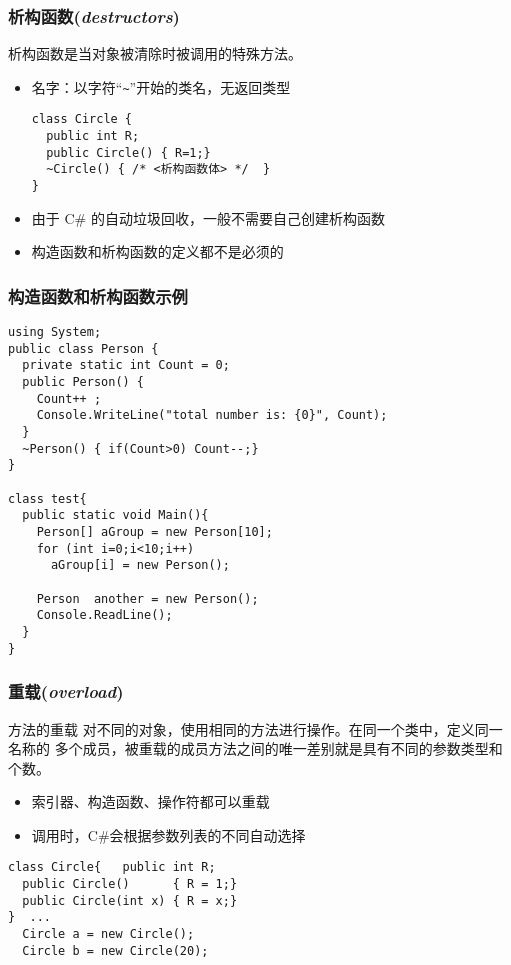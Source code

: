 \begin{frame}[fragile]
\frametitle{析构函数(\textit{destructors})}
析构函数是当对象被清除时被调用的特殊方法。
\begin{itemize}
\item 名字：以字符“\verb|~|”开始的类名，无返回类型
\begin{lstlisting}[escapeinside=<>]
class Circle {
  public int R;
  public Circle() { R=1;}
  ~Circle() { /* <析构函数体> */  }
}
\end{lstlisting}
  \pause
\item 由于 C\# 的自动垃圾回收，一般不需要自己创建析构函数
  \pause
\item 构造函数和析构函数的定义都不是必须的
\end{itemize}
\end{frame}

\begin{frame}
\frametitle{构造函数和析构函数示例}
\begin{lstlisting}
using System;
public class Person {
  private static int Count = 0;
  public Person() {
    Count++ ;
    Console.WriteLine("total number is: {0}", Count);
  }
  ~Person() { if(Count>0) Count--;}
}

class test{
  public static void Main(){
    Person[] aGroup = new Person[10];
    for (int i=0;i<10;i++)
      aGroup[i] = new Person();

    Person  another = new Person();
    Console.ReadLine();
  }
}

\end{lstlisting}
\end{frame}


\begin{frame}[fragile]
\frametitle{重载(\textit{overload})}
\begin{block}{方法的重载}
  \CJKindent 对不同的对象，使用相同的方法进行操作。在同一个类中，定义同一名称的
  多个成员，被重载的成员方法之间的唯一差别就是具有不同的参数类型和个数。
\end{block}
\pause
\begin{itemize}
\item 索引器、构造函数、操作符都可以重载
\item 调用时，C\#会根据参数列表的不同自动选择
\end{itemize}
\pause
\begin{lstlisting}[escapeinside=<>]
class Circle{   public int R;
  public Circle()      { R = 1;}
  public Circle(int x) { R = x;}
}  ...
  Circle a = new Circle();
  Circle b = new Circle(20);
\end{lstlisting}
\end{frame}

